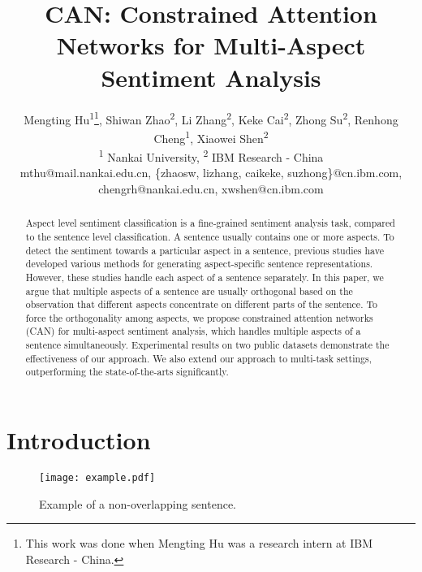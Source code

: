\documentclass[11pt,a4paper]{article}
\title{CAN: Constrained Attention Networks for Multi-Aspect Sentiment Analysis}
\author{Mengting Hu\textsuperscript{1}\thanks{\quad This work was done when Mengting Hu was a research intern at IBM Research - China.}, Shiwan Zhao\textsuperscript{2}, Li Zhang\textsuperscript{2}, Keke Cai\textsuperscript{2},
Zhong Su\textsuperscript{2}, Renhong Cheng\textsuperscript{1}, Xiaowei Shen\textsuperscript{2} \\
\textsuperscript{1} Nankai University, \textsuperscript{2} IBM Research - China \\
mthu@mail.nankai.edu.cn, \{zhaosw, lizhang, caikeke, suzhong\}@cn.ibm.com, \\ chengrh@nankai.edu.cn, xwshen@cn.ibm.com
}
\begin{document}
\maketitle
\begin{abstract}
Aspect level sentiment classification is a fine-grained sentiment analysis task, compared to the sentence level classification. A sentence usually contains one or more aspects. To detect the sentiment towards a particular aspect in a sentence, previous studies have developed various methods for generating aspect-specific sentence representations. However, these studies handle each aspect of a sentence separately. In this paper, we argue that multiple aspects of a sentence are usually orthogonal based on the observation that different aspects concentrate on different parts of the sentence. To force the orthogonality among aspects, we propose constrained attention networks (CAN) for multi-aspect sentiment analysis, which handles multiple aspects of a sentence simultaneously. Experimental results on two public datasets demonstrate the effectiveness of our approach. We also extend our approach to multi-task settings, outperforming the state-of-the-arts significantly.
\end{abstract}


\section{Introduction}


\begin{figure}
\setlength{\abovecaptionskip}{0.2cm}    %
\setlength{\belowcaptionskip}{-0.2cm}   %
\centering
\texttt{[image: example.pdf]}
\caption{Example of a non-overlapping sentence.} 
  \label{sentence} 
\end{figure}
\end{document}
